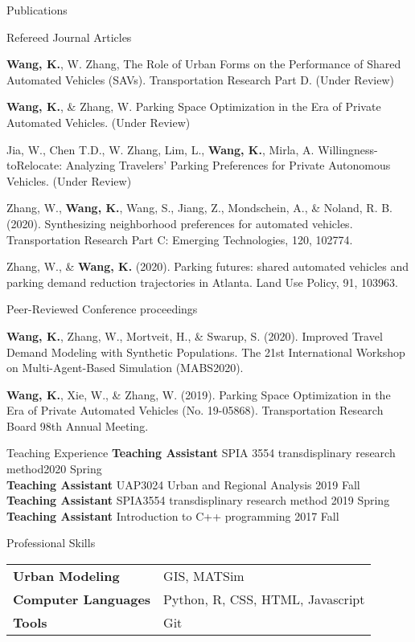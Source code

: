 \documentclass{resume} %
\begin{document}
\begin{rSection}{Publications}


\begin{rSubSection}{Refereed Journal Articles}

{\bf Wang, K.}, W. Zhang, The Role of Urban Forms on the Performance of Shared Automated Vehicles (SAVs). Transportation Research Part D. (Under Review)

{\bf Wang, K.}, \& Zhang, W. Parking Space Optimization in the Era of Private Automated Vehicles. (Under Review)

Jia, W., Chen T.D., W. Zhang, Lim, L., {\bf Wang, K.}, Mirla, A. Willingness-toRelocate: Analyzing Travelers' Parking Preferences for Private Autonomous Vehicles. (Under Review)

Zhang, W., {\bf Wang, K.}, Wang, S., Jiang, Z., Mondschein, A., \& Noland, R. B. (2020). Synthesizing neighborhood preferences for automated vehicles. Transportation Research Part C: Emerging Technologies, 120, 102774.

Zhang, W., \& {\bf Wang, K.} (2020). Parking futures: shared automated vehicles and parking demand reduction trajectories in Atlanta. Land Use Policy, 91, 103963.

\end{rSubSection}


\begin{rSubSection}{Peer-Reviewed Conference proceedings}

{\bf Wang, K.}, Zhang, W., Mortveit, H., \& Swarup, S. (2020). Improved Travel Demand Modeling with Synthetic Populations. The 21st International Workshop on Multi-Agent-Based Simulation (MABS2020).

{\bf Wang, K.}, Xie, W., \& Zhang, W. (2019). Parking Space Optimization in the Era of Private Automated Vehicles (No. 19-05868). Transportation Research Board 98th Annual Meeting.


\end{rSubSection}

\end{rSection}


\begin{rSection}{Teaching Experience}
{\bf Teaching Assistant} SPIA 3554 transdisplinary research method\hfill {2020 Spring}\\
{\bf Teaching Assistant} UAP3024 Urban and Regional Analysis \hfill {2019 Fall}\\
{\bf Teaching Assistant} SPIA3554 transdisplinary research method \hfill {2019 Spring}\\
{\bf Teaching Assistant} Introduction to C++ programming \hfill {2017 Fall}\\

\end{rSection}

\begin{rSection}{Professional Skills}
\begin{tabular}{ @{} >{\bfseries}l @{\hspace{6ex}} l }
Urban Modeling & GIS, MATSim\\
Computer Languages & Python, R, CSS, HTML, Javascript \\
Tools & Git\\
\end{tabular}
\end{rSection}
\end{document}
